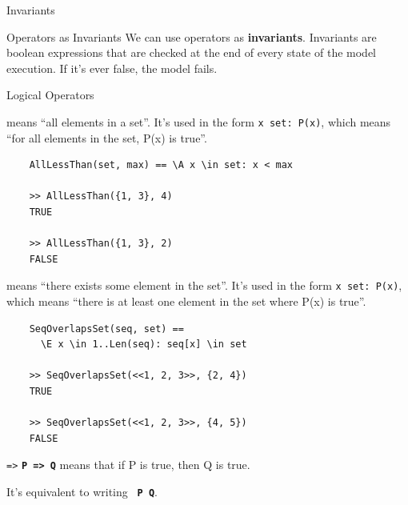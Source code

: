 \documentclass[10pt]{beamer}
\begin{document}
\begin{frame}{Invariants}
  \begin{exampleblock}{Operators as Invariants}
    We can use operators as \textbf{invariants}. Invariants are boolean expressions that are checked at the end of every state of the model execution. If it's ever false, the model fails.
  \end{exampleblock}
\end{frame}


\begin{frame}{Logical Operators}
  
  \begin{exampleblock}{\texttt{\A}}
    \textbf{\texttt{\A}} means ``all elements in a set''. It's used in the form \texttt{\A x \in set: P(x)}, which means ``for all elements in the set, P(x) is true''.
  \end{exampleblock}

  \begin{verbatim}
    AllLessThan(set, max) == \A x \in set: x < max

    >> AllLessThan({1, 3}, 4)
    TRUE

    >> AllLessThan({1, 3}, 2)
    FALSE
  \end{verbatim}

  \framebreak

  \begin{exampleblock}{\texttt{\E}}
    \textbf{\texttt{\E}} means ``there exists some element in the set''. It's used in the form \texttt{\E x \in set: P(x)}, which means ``there is at least one element in the set where P(x) is true''.
  \end{exampleblock}

  \begin{verbatim}
    SeqOverlapsSet(seq, set) ==
      \E x \in 1..Len(seq): seq[x] \in set

    >> SeqOverlapsSet(<<1, 2, 3>>, {2, 4})
    TRUE

    >> SeqOverlapsSet(<<1, 2, 3>>, {4, 5})
    FALSE
  \end{verbatim}
  
  \framebreak

  \begin{exampleblock}{\texttt{=>}}
    \textbf{\texttt{P => Q}} means that if P is true, then Q is true.
  \end{exampleblock}

  It's equivalent to writing \textbf{\texttt{~P \/ Q}}.
  

\end{frame}
\end{document}
